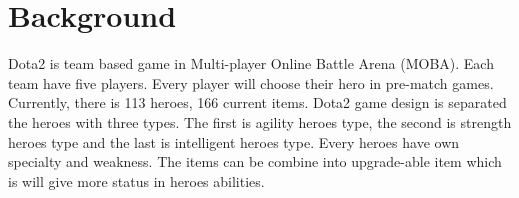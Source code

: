 \section{Background}
\label{sec:background}

Dota2 is team based game in Multi-player Online Battle Arena (MOBA). Each team have five players. Every player will choose their hero in pre-match games. Currently, there is 113 heroes, 166 current items. Dota2 game design is separated the heroes with three types. The first is agility heroes type, the second is strength heroes type and the last is intelligent heroes type. Every heroes have own specialty and weakness. The items can be combine into upgrade-able item which is will give more status in heroes abilities.
\\
